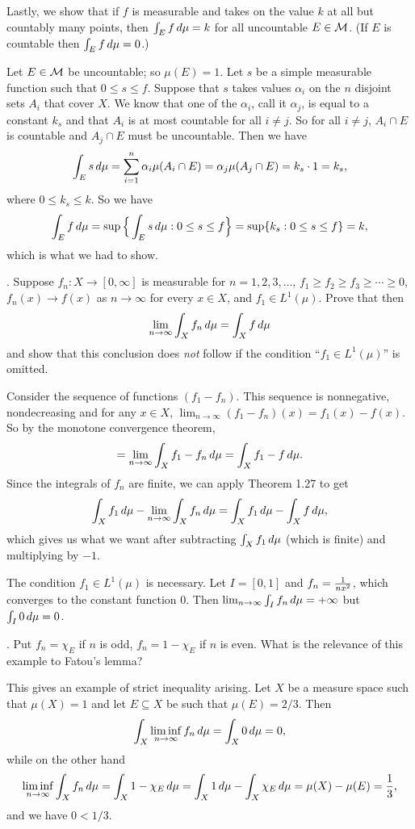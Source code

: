 Lastly, we show that if $f$ is measurable and takes on the value $k$ at all but countably many points, then $\int_E f\,d\mu = k$ for all uncountable $E\in {\cal M}$. (If $E$ is countable then $\int_E f\,d\mu = 0$.)

\proof Let $E\in {\cal M}$ be uncountable; so $\mu(E) = 1$. Let $s$ be a simple measurable function such that $0\leq s\leq f$. Suppose that $s$ takes values $\alpha_i$ on the $n$ disjoint sets $A_i$ that cover $X$. We know that one of the $\alpha_i$, call it $\alpha_j$, is equal to a constant $k_s$ and that $A_i$ is at most countable for all $i \neq j$. So for all $i \neq j$, $A_i \cap E$ is countable and $A_j \cap E$ must be uncountable. Then we have
$$\int_E s\,d\mu = \sum_{i=1}^n \alpha_i \mu(A_i\cap E) = \alpha_j\mu(A_j\cap E) = k_s\cdot 1 = k_s,$$
where $0\leq k_s \leq k$. So we have
$$\int_E f\,d\mu = \sup \Big\{ \int_E s\,d\mu : 0 \leq s\leq f\Big\} = \sup \{k_s : 0\leq s \leq f\} = k,$$
which is what we had to show.\slug

. Suppose $f_n : X\rightarrow[0,\infty]$ is measurable for $n=1,2,3,\ldots$, $f_1\geq f_2\geq f_3\geq\cdots\geq 0$, $f_n(x)\rightarrow f(x)$ as $n\rightarrow\infty$ for every $x\in X$, and $f_1\in L^1(\mu)$. Prove that then
$$\lim_{n\rightarrow\infty} \int_X f_n \,d\mu = \int_X f\,d\mu$$
and show that this conclusion does {\it not} follow if the condition ``$f_1\in L^1(\mu)$'' is omitted.

\proof Consider the sequence of functions $(f_1 - f_n)$. This sequence is nonnegative, nondecreasing and for any $x\in X$, $\lim_{n\rightarrow\infty} (f_1 - f_n)(x) = f_1(x) - f(x)$. So by the monotone convergence theorem,
$$= \lim_{n\rightarrow \infty} \int_X f_1 - f_n \,d\mu = \int_X f_1 - f\,d\mu.$$
Since the integrals of $f_n$ are finite, we can apply Theorem 1.27 to get
$$\int_X f_1\,d\mu - \lim_{n\rightarrow \infty}\int_X f_n \,d\mu = \int_X f_1\,d\mu -  \int_X f \,d\mu,$$
which gives us what we want after subtracting $\int_X f_1 \,d\mu$ (which is finite) and multiplying by $-1$.\slug

The condition $f_1\in L^1(\mu)$ is necessary. Let $I = [0,1]$ and $f_n = {1\over nx^2}$, which converges to the constant function 0. Then $\lim_{n\rightarrow \infty} \int_I f_n \,d\mu = +\infty$ but $\int_I 0\,d\mu = 0$.

. Put $f_n = \chi_E$ if $n$ is odd, $f_n = 1 - \chi_E$ if $n$ is even. What is the relevance of this example to Fatou's lemma?

This gives an example of strict inequality arising. Let $X$ be a measure space such that $\mu(X) = 1$ and let $E\subseteq X$ be such that $\mu(E) = 2/3$. Then
$$\int_X \liminf_{n\rightarrow\infty} f_n \,d\mu = \int_X 0 \,d\mu = 0,$$
while on the other hand
$$\liminf_{n\rightarrow\infty} \int_X f_n\,d\mu = \int_X 1 - \chi_E \,d\mu = \int_X 1 \,d\mu - \int_X \chi_E \,d\mu = \mu(X) - \mu(E) = {1\over 3},$$
and we have $0<1/3$.

\bye
